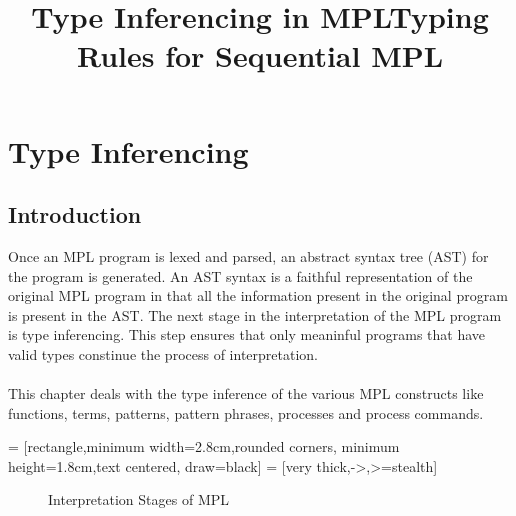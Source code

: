 \documentclass[11pt]{article}
\title{Type Inferencing in MPL}
\title{Typing Rules for Sequential MPL}
\begin{document}
\maketitle

\section{Type Inferencing}

\subsection {Introduction}
Once an MPL program is lexed and parsed, an abstract syntax tree (AST) for the program is generated. An AST syntax is a faithful representation of the original MPL program in that all the information present in the original program is present in the AST. The next stage in the interpretation of the MPL program is type inferencing. This step ensures that only meaninful programs that have valid types constinue the process of interpretation.
~~\\~~\\
This chapter deals with the type inference of the various MPL constructs like functions, terms, patterns, pattern phrases, processes and process commands.

 = [rectangle,minimum width=2.8cm,rounded corners,
                     minimum height=1.8cm,text centered, draw=black]
 = [very thick,->,>=stealth]
\begin{figure}[h!]
\begin {center}
\caption{Interpretation Stages of MPL} \label{fig:CSAM}
\end{center}
\end{figure}
\end{document}
